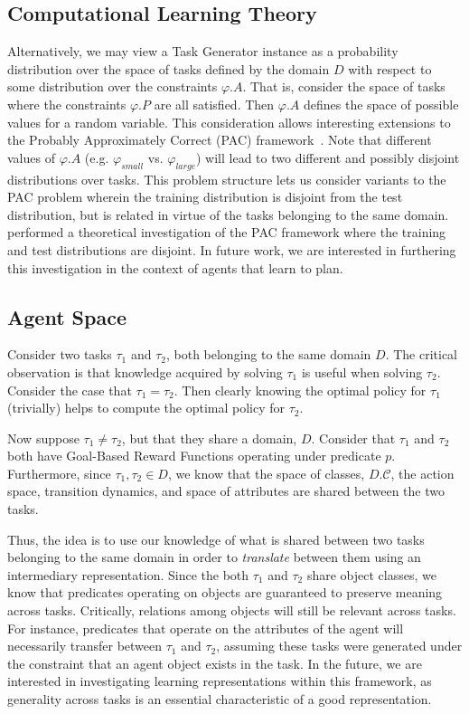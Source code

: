\documentclass[11pt]{article}
\begin{document}
\subsection{Computational Learning Theory}
Alternatively, we may view a Task Generator instance as a probability distribution over the space of tasks defined by the domain $D$ with respect to some distribution over the constraints $\varphi.A$. That is, consider the space of tasks where the constraints $\varphi.P$ are all satisfied. Then $\varphi.A$ defines the space of possible values for a random variable. This consideration allows interesting extensions to the Probably Approximately Correct (PAC) framework~\cite{valiant1984theory}. Note that different values of $\varphi.A$ (e.g. $\varphi_{small}$ vs. $\varphi_{large}$) will lead to two different and possibly disjoint distributions over tasks. This problem structure lets us consider variants to the PAC problem wherein the training distribution is disjoint from the test distribution, but is related in virtue of the tasks belonging to the same domain. ~\cite{baxter2000model} performed a theoretical investigation of the PAC framework where the training and test distributions are disjoint. In future work, we are interested in furthering this investigation in the context of agents that learn to plan.

\subsection{Agent Space}
Consider two tasks $\tau_1$ and $\tau_2$, both belonging to the same domain $D$. The critical observation is that knowledge acquired by solving $\tau_1$ is useful when solving $\tau_2$. Consider the case that $\tau_1 = \tau_2$. Then clearly knowing the optimal policy for $\tau_1$ (trivially) helps to compute the optimal policy for $\tau_2$.

Now suppose $\tau_1 \neq \tau_2$, but that they share a domain, $D$. Consider that $\tau_1$ and $\tau_2$ both have Goal-Based Reward Functions operating under predicate $p$. Furthermore, since $\tau_1, \tau_2 \in D$, we know that the space of classes, $D.\mathcal{C}$, the action space, transition dynamics, and space of attributes are shared between the two tasks.

Thus, the idea is to use our knowledge of what is shared between two tasks belonging to the same domain in order to {\it translate} between them using an intermediary representation. Since the both $\tau_1$ and $\tau_2$ share object classes, we know that predicates operating on objects are guaranteed to preserve meaning across tasks. Critically, relations among objects will still be relevant across tasks. For instance, predicates that operate on the attributes of the agent will necessarily transfer between $\tau_1$ and $\tau_2$, assuming these tasks were generated under the constraint that an agent object exists in the task. In the future, we are interested in investigating learning representations within this framework, as generality across tasks is an essential characteristic of a good representation.
\end{document}
